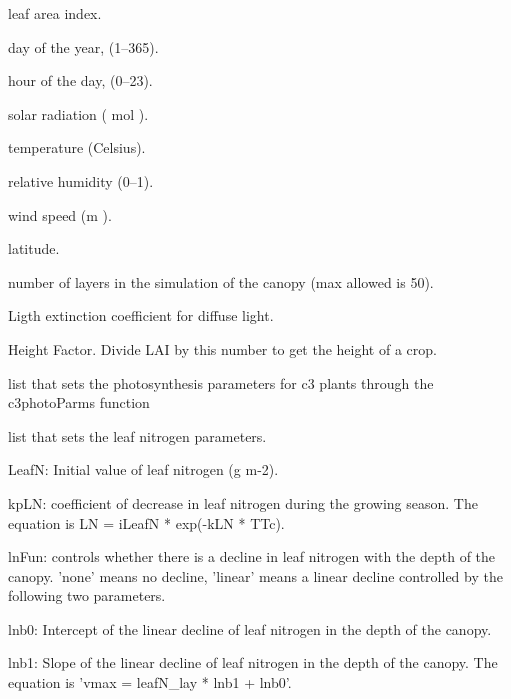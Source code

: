 \documentclass[letterpaper]{book}
\begin{document}
%
\begin{Arguments}
\begin{ldescription}
\item[\code{lai}] leaf area index.

\item[\code{doy}] day of the year, (1--365).

\item[\code{hr}] hour of the day, (0--23).

\item[\code{solar}] solar radiation (\eqn{\mu}{} mol
 ).

\item[\code{temp}] temperature (Celsius).

\item[\code{rh}] relative humidity (0--1).

\item[\code{windspeed}] wind speed (m ).

\item[\code{lat}] latitude.

\item[\code{nlayers}] number of layers in the simulation of the
canopy (max allowed is 50).

\item[\code{kd}] Ligth extinction coefficient for diffuse
light.

\item[\code{heightFactor}] Height Factor. Divide LAI by this
number to get the height of a crop.

\item[\code{c3photoControl}] list that sets the photosynthesis
parameters for c3 plants through the c3photoParms
function

\item[\code{lnControl}] list that sets the leaf nitrogen
parameters.

LeafN: Initial value of leaf nitrogen (g m-2).

kpLN: coefficient of decrease in leaf nitrogen during the
growing season. The equation is LN = iLeafN * exp(-kLN *
TTc).

lnFun: controls whether there is a decline in leaf
nitrogen with the depth of the canopy. 'none' means no
decline, 'linear' means a linear decline controlled by
the following two parameters.

lnb0: Intercept of the linear decline of leaf nitrogen in
the depth of the canopy.

lnb1: Slope of the linear decline of leaf nitrogen in the
depth of the canopy. The equation is 'vmax = leafN\_lay *
lnb1 + lnb0'.
\end{ldescription}
\end{Arguments}
\end{document}
